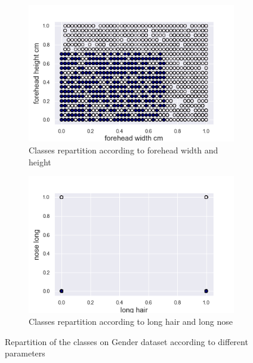 \documentclass[twocolumn, 10pt]{article}
\begin{document}
			\begin{figure}[h]
				\centering
				\begin{subfigure}[t]{.49\columnwidth}
					\centering
					\includegraphics[width=\linewidth]{../graphics/org_forehead_width_cm_forehead_height_cm_label.png}
					\caption{Classes repartition according to forehead width and height}
					\label{fig:g_org_for}
				\end{subfigure}
				\begin{subfigure}[t]{.49\columnwidth}
					\centering
					\includegraphics[width=\linewidth]{../graphics/org_long_hair_nose_long_label.png}
					\caption{Classes repartition according to long hair and long nose}
					\label{fig:g_org_hair}
				\end{subfigure}
				\caption{Repartition of the classes on Gender dataset according to different parameters}
				\label{fig:g_org}
			\end{figure}
\end{document}
